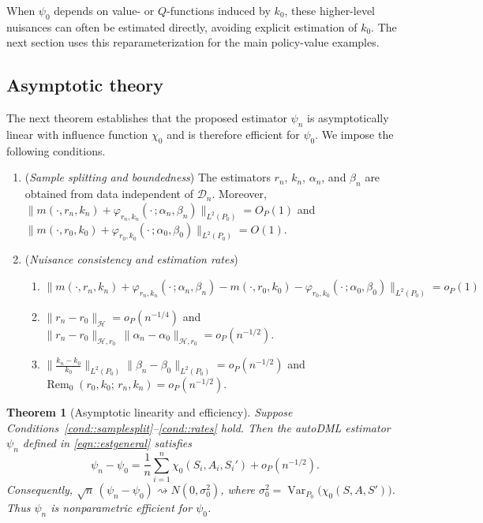 \documentclass[12pt]{article}
\theoremstyle{plain}
\newtheorem{theorem}{Theorem}
\begin{document}
When \(\psi_0\) depends on value- or \(Q\)-functions induced by \(k_0\), these
higher-level nuisances can often be estimated directly, avoiding explicit
estimation of \(k_0\). The next section uses this reparameterization for the main
policy-value examples.

 

 

\subsection{Asymptotic theory}

The next theorem establishes that the proposed estimator $\psi_n$ is asymptotically
linear with influence function $\chi_0$ and is therefore efficient for $\psi_0$.
We impose the following conditions.

\begin{enumerate}[label=\textbf{(C\arabic*)}, ref=C\arabic*, resume=cond]
\item (\textit{Sample splitting and boundedness}) \label{cond::samplesplit} \label{cond::bounded}
The estimators \(r_n\), \(k_n\), \(\alpha_n\), and \(\beta_n\) are obtained from data independent of \(\mathcal D_n\). Moreover, \(\bigl\|m(\cdot,r_n,k_n)+\varphi_{r_n,k_n}(\cdot\,;\alpha_n,\beta_n)\bigr\|_{L^2(P_0)}=O_P(1)\) and
\(\bigl\|m(\cdot,r_0,k_0)+\varphi_{r_0,k_0}(\cdot\,;\alpha_0,\beta_0)\bigr\|_{L^2(P_0)}=O(1)\).
 

\item (\textit{Nuisance consistency and estimation rates}) \label{cond::rates}
\begin{enumerate}[label=(\alph*)]
\item \label{cond::consistency} \(\bigl\|m(\cdot,r_n,k_n)+\varphi_{r_n,k_n}(\cdot\,;\alpha_n,\beta_n)-m(\cdot,r_0,k_0)-\varphi_{r_0,k_0}(\cdot\,;\alpha_0,\beta_0)\bigr\|_{L^2(P_0)}=o_P(1)\) 
    \item \label{cond::reward} \label{cond::representers} \(\|r_n-r_0\|_{\mathcal H}=o_P(n^{-1/4})\) and  \(\|r_n-r_0\|_{\mathcal H,r_0}\,\|\alpha_n-\alpha_0\|_{\mathcal H,r_0}=o_P(n^{-1/2})\).
    \item \label{cond::beta} \label{cond::remainder} \(\big\|\tfrac{k_n-k_0}{k_0}\big\|_{L^2(P_0)}\|\beta_n-\beta_0\|_{L^2(P_0)}=o_P(n^{-1/2})\) and  \(\operatorname{Rem}_0(r_0,k_0;\,r_n,k_n)=o_P(n^{-1/2})\).
\end{enumerate}
\end{enumerate}


\begin{theorem}[Asymptotic linearity and efficiency]
\label{thm:asymptotic_linearity}
Suppose Conditions~\ref{cond::samplesplit}--\ref{cond::rates} hold.  
Then the autoDML estimator $\psi_n$ defined in \eqref{eqn::estgeneral} satisfies
\[
\psi_n - \psi_0
= \frac{1}{n}\sum_{i=1}^n \chi_0(S_i,A_i,S_i') + o_P(n^{-1/2}).
\]
Consequently, $\sqrt{n}\,(\psi_n - \psi_0) \rightsquigarrow N(0,\sigma_0^2)$,  
where $\sigma_0^2 = \operatorname{Var}_{P_0}\!\big(\chi_0(S,A,S')\big)$.
Thus $\psi_n$ is nonparametric efficient for $\psi_0$.
\end{theorem}
\end{document}
